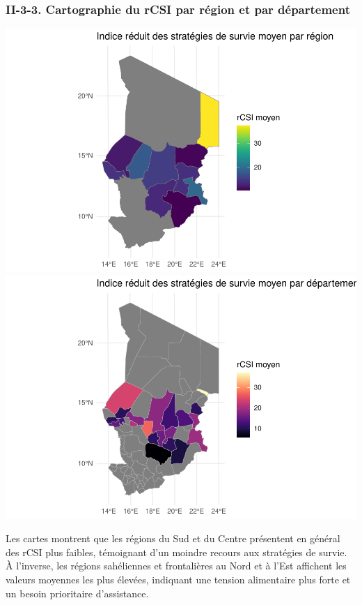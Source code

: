 \documentclass[
]{article}
\begin{document}
\hypertarget{ii-3-3.-cartographie-du-rcsi-par-ruxe9gion-et-par-duxe9partement}{%
\subsubsection{II-3-3. Cartographie du rCSI par région et par
département}\label{ii-3-3.-cartographie-du-rcsi-par-ruxe9gion-et-par-duxe9partement}}

\includegraphics{Rapport_PAN_files/figure-latex/rCSI_map-1.pdf}
\includegraphics{Rapport_PAN_files/figure-latex/rCSI_map-2.pdf}

Les cartes montrent que les régions du Sud et du Centre présentent en
général des rCSI plus faibles, témoignant d'un moindre recours aux
stratégies de survie. À l'inverse, les régions sahéliennes et
frontalières au Nord et à l'Est affichent les valeurs moyennes les plus
élevées, indiquant une tension alimentaire plus forte et un besoin
prioritaire d'assistance.
\end{document}
